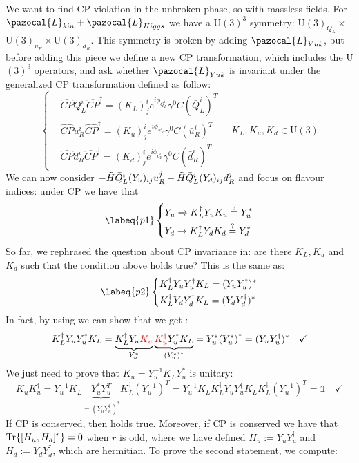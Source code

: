 \documentclass[../main.tex]{subfiles}
\begin{document}
We want to find CP violation in the unbroken phase, so with massless fields. For $\pazocal{L}_{kin}+\pazocal{L}_{Higgs}$ we have a U$(3)^3$ symmetry: U$(3)_{Q_L}\times$U$(3)_{u_R}\times$U$(3)_{d_R}$. This symmetry is broken by adding $\pazocal{L}_{Yuk}$, but before adding this piece we define a new CP transformation, which includes the U$(3)^3$ operators, and ask whether $\pazocal{L}_{Yuk}$ is invariant under the generalized CP transformation defined as follow:
\[
\left\{
\begin{aligned}
&\hat{CP}Q_L^i\hat{CP}^\dagger=(K_L)^i_je^{i\phi_{Q_L^i}}\gamma^0C(\bar{Q}_L^i)^T\\
&\hat{CP}u_R^i\hat{CP}^\dagger=(K_u)^i_je^{i\phi_{u_R^i}}\gamma^0C(\bar{u}_R^i)^T\\
&\hat{CP}d_R^i\hat{CP}^\dagger=(K_d)^i_je^{i\phi_{d_R^i}}\gamma^0C(\bar{d}_R^i)^T
\end{aligned}
\right.
\quad 
K_L,K_u,K_d\in\text{U}(3)
\]
We can now consider $-\Tilde{H}\bar{Q}_L^i(Y_u)_{ij}u_R^j-\Tilde{H}\bar{Q}_L^i(Y_d)_{ij}d_R^j$ and focus on flavour indices: under CP we have that
\begin{equation}
\labeq{p1}
\left\{
\begin{aligned}
&Y_u\xrightarrow[]{}K_L^\dagger Y_uK_u\stackrel{?}{=}Y_u^*\\
&Y_d\xrightarrow[]{}K_L^\dagger Y_dK_d\stackrel{?}{=}Y_d^*
\end{aligned}
\right.
\end{equation}
So far, we rephrased the question about CP invariance in: are there $K_L,K_u$ and $K_d$ such that the condition above holds true? This is the same as:
\begin{equation}
\labeq{p2}
\left\{
\begin{aligned}
&K_L^\dagger Y_uY_u^\dagger K_L=(Y_uY_u^\dagger)^*\\
&K_L^\dagger Y_dY_d^\dagger K_L=(Y_dY_d^\dagger)^*
\end{aligned}
\right.
\end{equation}
In fact, by using  we can show that we get :
\[
K_L^\dagger Y_uY_u^\dagger K_L=\underbrace{K_L^\dagger Y_u{\color{red}K_u}}_{Y_u^*}\underbrace{{\color{red}K_u^\dagger}Y_u^\dagger K_L}_{(Y_u^*)^\dagger}=Y_u^*(Y_u^*)^\dagger=(Y_uY_u^\dagger)^* \quad \checkmark
\]
We just need to prove that $K_u=Y_u^{-1}K_LY_u^*$ is unitary:
\[
K_uK_u^\dagger=Y_u^{-1}K_L\underbrace{Y_u^*Y_u^T}_{=(Y_uY_u^\dagger)^*}K_L^\dagger(Y_u^{-1})^T=Y_u^{-1}K_LK_L^\dagger Y_uY_u^\dagger K_LK_L^\dagger(Y_u^{-1})^T=\mathbb{1} \quad \checkmark
\]
If CP is conserved, then  holds true. Moreover, if CP is conserved we have that $\Tr{[H_u,H_d]^r}=0$ when $r$ is odd, where we have defined $H_u:=Y_uY_u^\dagger$ and $H_d:=Y_dY_d^\dagger$, which are hermitian. To prove the second statement, we compute:
\end{document}
